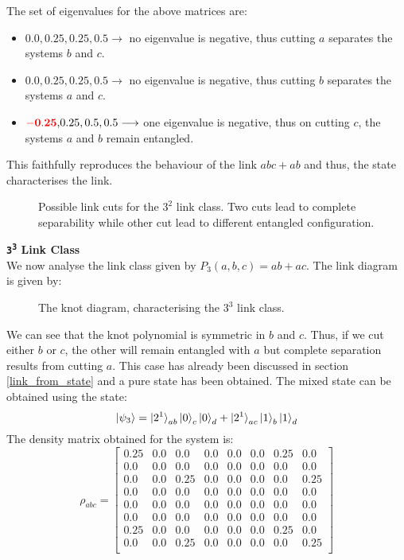 \documentclass{scrartcl}
\begin{document}
    The set of eigenvalues for the above matrices are:
    \begin{itemize}
        \item $0.0, 0.25, 0.25, 0.5 \longrightarrow$ no eigenvalue is negative, thus cutting $a$ separates the systems $b$ and $c$.        
        \item $0.0, 0.25, 0.25, 0.5 \longrightarrow$ no eigenvalue is negative, thus cutting $b$ separates the systems $a$ and $c$.        
       \item $ \mathbf{\mathcolor{red}{-0.25},} 0.25, 0.5, 0.5 \longrightarrow$ one eigenvalue is negative, thus on cutting $c$, the systems $a$ and $b$ remain entangled.
    \end{itemize}
    This faithfully reproduces the behaviour of the link $abc+ab$ and thus, the state characterises the link.\begin{figure}[H]
        \centering
        \scalebox{0.8}{ }
        \caption{Possible link cuts for the $3^2$ link class. Two cuts lead to complete separability while other cut lead to different entangled configuration.}
    \end{figure}
    \noindent
\textbf{\large \texttt{3\textsuperscript{3}} Link Class} \\[0.3cm]
We now analyse the link class given by $P_3(a,b,c) = ab+ac$. The link diagram is given by:
\begin{figure}[H]
    \centering
    
  \caption{The knot diagram, characterising the $3^3$ link class.}
\end{figure}
\noindent
We can see that the knot polynomial is symmetric in $b$ and $c$. Thus, if we cut either $b$ or $c$, the other will remain entangled with $a$ but complete separation results from cutting $a$. This case has already been discussed in section \ref{link_from_state} and a pure state has been obtained. The mixed state can be obtained using the state:
$$\ket{\psi_3} = \ket{2^1}_{ab}\ket{0}_c\ket{0}_d + \ket{2^1}_{ac}\ket{1}_b\ket{1}_d  $$ 
The density matrix obtained for the system is: 
\begin{equation*}
    \rho_{abc}=
    \left[
    \begin{array}{cccccccc}
    0.25 & 0.0 & 0.0 & 0.0 & 0.0 & 0.0 & 0.25 & 0.0 \\
    0.0 & 0.0 & 0.0 & 0.0 & 0.0 & 0.0 & 0.0 & 0.0 \\
    0.0 & 0.0 & 0.25 & 0.0 & 0.0 & 0.0 & 0.0 & 0.25 \\
    0.0 & 0.0 & 0.0 & 0.0 & 0.0 & 0.0 & 0.0 & 0.0 \\
    0.0 & 0.0 & 0.0 & 0.0 & 0.0 & 0.0 & 0.0 & 0.0 \\
    0.0 & 0.0 & 0.0 & 0.0 & 0.0 & 0.0 & 0.0 & 0.0 \\
    0.25 & 0.0 & 0.0 & 0.0 & 0.0 & 0.0 & 0.25 & 0.0 \\
    0.0 & 0.0 & 0.25 & 0.0 & 0.0 & 0.0 & 0.0 & 0.25 \\
    \end{array}
    \right]
    \end{equation*}
\end{document}
